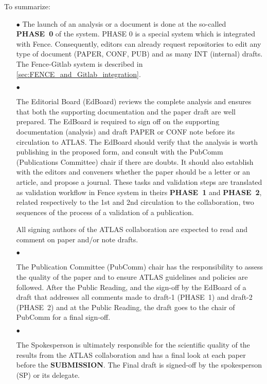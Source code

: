 To summarize:
\begin{itemize}

    \item[$\bullet$]
The launch of an analysis or a document is done at the so-called \textbf{PHASE~0} of the system. PHASE 0 is a special system which is integrated with Fence. Consequently, editors can already request repositories to edit any type of document (PAPER, CONF, PUB) and as many INT (internal)  drafts. The Fence-Gitlab system is described in \cref{sec:FENCE_and_Gitlab_integration}.

    \item[$\bullet$]
    
The Editorial Board (EdBoard) reviews the complete analysis and ensures that both the supporting documentation and the paper draft are well prepared. The EdBoard is required to sign off on the supporting documentation (analysis) and draft PAPER or CONF note before its circulation to ATLAS. The EdBoard should verify that the analysis is worth publishing in the proposed form, and consult with the PubComm (Publications Committee) chair if there are doubts. It should also establish with the editors and conveners whether the paper should be a letter or an article, and propose a journal. These tasks and validation steps are translated as validation workflow in Fence system in theirs \textbf{PHASE~1} and \textbf{PHASE~2}, related respectively to the 1st and 2nd circulation to the collaboration, two sequences of the process of a validation of a publication.

All signing authors of the ATLAS collaboration are expected to read and comment on paper and/or note drafts.

    \item[$\bullet$]

The Publication Committee (PubComm) chair has the responsibility to assess the quality of the paper and to ensure ATLAS guidelines and policies are followed. After the Public Reading, and the sign-off by the EdBoard of a draft  that addresses all comments made to draft-1 (PHASE~1) and draft-2 (PHASE~2)  and at the Public Reading, the draft goes to the chair of PubComm for a final sign-off.

    \item[$\bullet$]

The Spokesperson is ultimately responsible for the scientific quality of the results from the ATLAS collaboration and has a final look at each paper before the \textbf{SUBMISSION}. The Final draft  is signed-off by the spokesperson (SP) or its delegate. 


\end{itemize}

